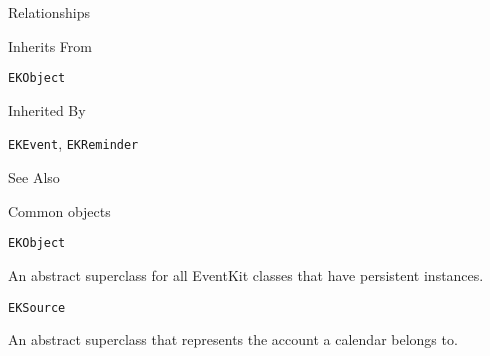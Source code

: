 \documentclass{article}
\begin{document}
Relationships

Inherits From

\texttt{EKObject}

Inherited By

\texttt{EKEvent}, \texttt{EKReminder}

See Also

Common objects

\texttt{EKObject}

An abstract superclass for all EventKit classes that have persistent instances.

\texttt{EKSource}

An abstract superclass that represents the account a calendar belongs to.

\newpage
\end{document}
